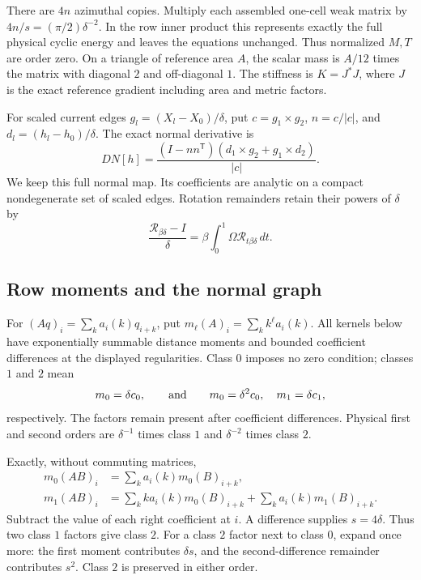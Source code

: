 \documentclass[11pt,a4paper]{article}
\numberwithin{equation}{section}
\theoremstyle{remark}
\begin{document}
There are \(4n\) azimuthal copies. Multiply each assembled one-cell
weak matrix by \(4n/s=(\pi/2)\delta^{-2}\). In the row inner product
this represents exactly the full physical cyclic energy and leaves
the equations unchanged. Thus normalized \(M,T\) are order zero.
On a triangle of reference area \(A\), the scalar mass is \(A/12\)
times the matrix with diagonal \(2\) and off-diagonal \(1\).
The stiffness is \(K=J^*J\), where \(J\) is the exact reference
gradient including area and metric factors.

For scaled current edges \(g_l=(X_l-X_0)/\delta\), put
\(c=g_1\times g_2\), \(n=c/|c|\), and
\(d_l=(h_l-h_0)/\delta\). The exact normal derivative is
\begin{equation}\label{eq:normal-derivative}
 DN[h]=\frac{(I-nn^{\mathsf T})(d_1\times g_2+g_1\times d_2)}{|c|}.
\end{equation}
We keep this full normal map. Its coefficients are analytic on a
compact nondegenerate set of scaled edges. Rotation remainders
retain their powers of \(\delta\) by
\[
 \frac{\mathcal R_{\beta\delta}-I}{\delta}
       =\beta\int_0^1\Omega\mathcal R_{t\beta\delta}\,dt .
\]

\subsection{Row moments and the normal graph}

For \((Aq)_i=\sum_k a_i(k)q_{i+k}\), put
\(m_\ell(A)_i=\sum_k k^\ell a_i(k)\).
All kernels below have exponentially summable distance moments and
bounded coefficient differences at the displayed regularities.
Class \(0\) imposes no zero condition; classes \(1\) and \(2\) mean
\[
 m_0=\delta c_0,\qquad\hbox{and}\qquad
 m_0=\delta^2c_0,\quad m_1=\delta c_1 ,
\]
respectively. The factors remain present after coefficient differences.
Physical first and second orders are \(\delta^{-1}\) times class \(1\)
and \(\delta^{-2}\) times class \(2\).

Exactly, without commuting matrices,
\begin{align}
 m_0(AB)_i&=\sum_k a_i(k)m_0(B)_{i+k},\nonumber\\
 m_1(AB)_i&=\sum_k k a_i(k)m_0(B)_{i+k}
                    +\sum_k a_i(k)m_1(B)_{i+k}.\label{eq:mom-products}
\end{align}
Subtract the value of each right coefficient at \(i\). A difference
supplies \(s=4\delta\). Thus two class \(1\) factors give class \(2\).
For a class \(2\) factor next to class \(0\), expand once more: the
first moment contributes \(\delta s\), and the second-difference
remainder contributes \(s^2\). Class \(2\) is preserved in either order.
\end{document}
